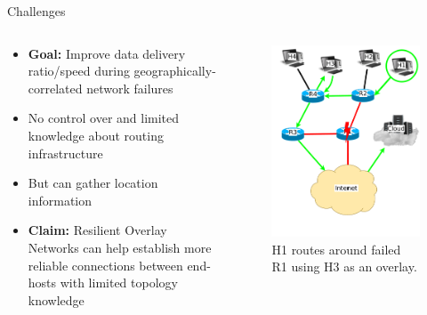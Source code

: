 \documentclass[pdftex]{beamer}
\begin{document}
\begin{frame}{Challenges}
\begin{columns}
\begin{column}{.5\textwidth}
\begin{itemize}
	\item \textbf{Goal:} Improve data delivery ratio/speed during geographically-correlated network failures
	\item No control over and limited knowledge about routing infrastructure
	\item But can gather location information
	\item \textbf{Claim:} Resilient Overlay Networks can help establish more reliable connections between end-hosts with limited topology knowledge
\end{itemize}
\end{column}

\begin{column}{.5\textwidth}
\begin{figure}
\includegraphics[height=.6\textheight]{overlay_path}
\caption{H1 routes around failed R1 using H3 as an overlay.}
\end{figure}
\end{column}

\end{columns}
\end{frame}
\end{document}
